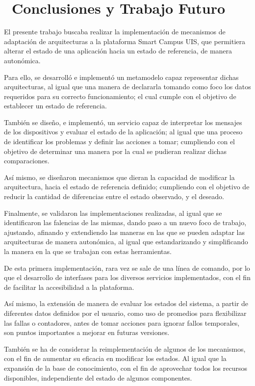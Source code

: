 \newpage
\section{\ Conclusiones y Trabajo Futuro} \label{sec:future}

El presente trabajo buscaba realizar la implementación de mecanismos de adaptación de arquitecturas a la plataforma Smart Campus UIS, que permitiera alterar el estado de una aplicación hacia un estado de referencia, de manera autonómica.

Para ello, se desarrolló e implementó un metamodelo capaz representar dichas arquitecturas, al igual que una manera de declararla tomando como foco los datos requeridos para su correcto funcionamiento; el cual cumple con el objetivo de establecer un estado de referencia.

También se diseño, e implementó, un servicio capaz de interpretar los mensajes de los dispositivos y evaluar el estado de la aplicación; al igual que una proceso de identificar los problemas y definir las acciones a tomar; cumpliendo con el objetivo de determinar una manera por la cual se pudieran realizar dichas comparaciones.

Así mismo, se diseñaron mecanismos que dieran la capacidad de modificar la arquitectura, hacia el estado de referencia definido; cumpliendo con el objetivo de reducir la cantidad de diferencias entre el estado observado, y el deseado.

Finalmente, se validaron las implementaciones realizadas, al igual que se identificaron las falencias de las mismas, dando paso a un nuevo foco de trabajo, ajustando, afinando y extendiendo las maneras en las que se pueden adaptar las arquitecturas de manera autonómica, al igual que estandarizando y simplificando la manera en la que se trabajan con estas herramientas.

De esta primera implementación, rara vez se sale de una línea de comando, por lo que el desarrollo de interfases para los diversos servicios implementados, con el fin de facilitar la accesibilidad a la plataforma.

Así mismo, la extensión de manera de evaluar los estados del sistema, a partir de diferentes datos definidos por el usuario, como uso de promedios para flexibilizar las fallas o contadores, antes de tomar acciones para ignorar fallos temporales, son puntos importantes a mejorar en futuras versiones.

También se ha de considerar la reimplementación de algunos de los mecanismos, con el fin de aumentar su eficacia en modificar los estados. Al igual que la expansión de la base de conocimiento, con el fin de aprovechar todos los recursos disponibles, independiente del estado de algunos componentes.

